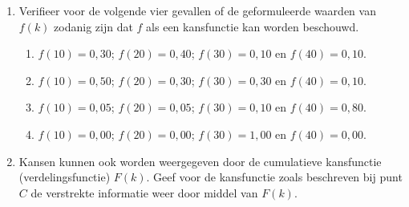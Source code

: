 \begin{enumerate}[label=(\alph*)]
    \item Verifieer voor de volgende vier gevallen of de geformuleerde waarden van $f(k)$ zodanig 
    zijn dat $f$ als een kansfunctie kan worden beschouwd.
    \begin{enumerate}[label=(\Alph*)]
        \item $f(10) = 0,30$; $f(20) = 0,40$; $f(30) = 0,10$ en $f(40) = 0,10$.
        \item $f(10) = 0,50$; $f(20) = 0,30$; $f(30) = 0,30$ en $f(40) = 0,10$.
        \item $f(10) = 0,05$; $f(20) = 0,05$; $f(30) = 0,10$ en $f(40) = 0,80$. 
        \item $f(10) = 0,00$; $f(20) = 0,00$; $f(30) = 1,00$ en $f(40) = 0,00$. 
    \end{enumerate}

    \item Kansen kunnen ook worden weergegeven door de cumulatieve kansfunctie 
    (verdelingsfunctie) $F(k)$. Geef voor de kansfunctie zoals beschreven bij punt $C$ de verstrekte 
    informatie weer door middel van $F(k)$. 
\end{enumerate}